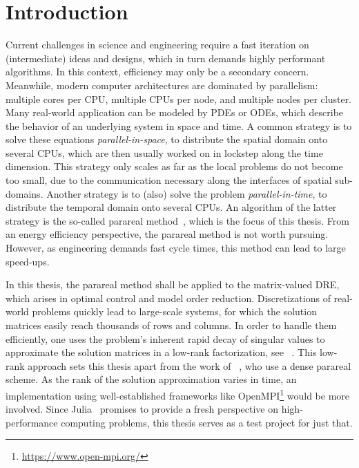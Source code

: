 \chapter{Introduction}

Current challenges in science and engineering require a fast iteration on (intermediate) ideas and designs,
which in turn demands highly performant algorithms.
In this context, efficiency may only be a secondary concern.
Meanwhile, modern computer architectures are dominated by parallelism:
multiple cores per CPU,
multiple CPUs per node,
and
multiple nodes per cluster.
Many real-world application can be modeled by \acp{PDE} or \acp{ODE},
which describe the behavior of an underlying system in space and time.
A common strategy is to solve these equations \emph{parallel-in-space},
\ie to distribute the spatial domain onto several CPUs,
which are then usually worked on in lockstep along the time dimension.
This strategy only scales as far as the local problems do not become too small,
due to the communication necessary along the interfaces of spatial sub-domains.
Another strategy is to (also) solve the problem \emph{parallel-in-time},
\ie to distribute the temporal domain onto several CPUs.
An algorithm of the latter strategy is the so-called parareal method~\cite{Lions2001},
which is the focus of this thesis.
From an energy efficiency perspective,
the parareal method is not worth pursuing.
However, as engineering demands fast cycle times,
this method can lead to large speed-ups.

In this thesis, the parareal method shall be applied to the matrix-valued \ac{DRE},
which arises \eg in optimal control and model order reduction.
Discretizations of real-world problems quickly lead to large-scale systems,
for which the solution matrices easily reach thousands of rows and columns.
In order to handle them efficiently,
one uses the problem's inherent rapid decay of singular values
to approximate the solution matrices in a low-rank factorization, see \eg~\cite{Penzl2000,Kuerschner2016,Lang2017}.
This low-rank approach sets this thesis apart from the work of \citeauthor{Koehler2016}~\cite{Koehler2016},
who use a dense parareal scheme.
As the rank of the solution approximation varies in time,
an implementation using well-established frameworks like OpenMPI\footnote{\url{https://www.open-mpi.org/}}
would be more involved.
Since Julia~\cite{Julia} promises to provide a fresh perspective on high-performance computing problems,
this thesis serves as a test project for just that.

